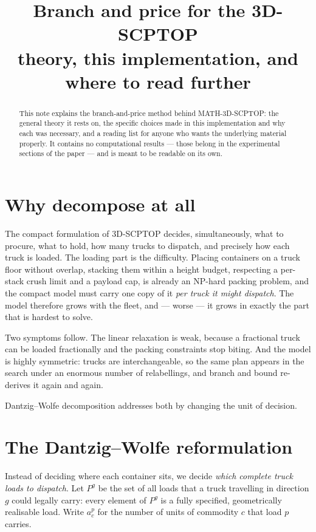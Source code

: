 \documentclass[11pt,a4paper]{article}
\title{Branch and price for the 3D-SCPTOP\\[4pt]
\large theory, this implementation, and where to read further}
\author{}
\date{}
\begin{document}
\maketitle

\begin{abstract}
\noindent This note explains the branch-and-price method behind
MATH-3D-SCPTOP: the general theory it rests on, the specific choices made in
this implementation and why each was necessary, and a reading list for anyone
who wants the underlying material properly. It contains no computational
results --- those belong in the experimental sections of the paper --- and is
meant to be readable on its own.
\end{abstract}

\tableofcontents

\section{Why decompose at all}

The compact formulation of 3D-SCPTOP decides, simultaneously, what to procure,
what to hold, how many trucks to dispatch, and precisely how each truck is
loaded. The loading part is the difficulty. Placing containers on a truck floor
without overlap, stacking them within a height budget, respecting a per-stack
crush limit and a payload cap, is already an NP-hard packing problem, and the
compact model must carry one copy of it \emph{per truck it might dispatch}. The
model therefore grows with the fleet, and --- worse --- it grows in exactly the
part that is hardest to solve.

Two symptoms follow. The linear relaxation is weak, because a fractional truck
can be loaded fractionally and the packing constraints stop biting. And the
model is highly symmetric: trucks are interchangeable, so the same plan appears
in the search under an enormous number of relabellings, and branch and bound
re-derives it again and again.

Dantzig--Wolfe decomposition addresses both by changing the unit of decision.

\section{The Dantzig--Wolfe reformulation}

Instead of deciding where each container sits, we decide \emph{which complete
truck loads to dispatch}. Let $P^{g}$ be the set of all loads that a truck
travelling in direction $g$ could legally carry: every element of $P^{g}$ is a
fully specified, geometrically realisable load. Write $a^{p}_{c}$ for the number
of units of commodity $c$ that load $p$ carries.
\end{document}
